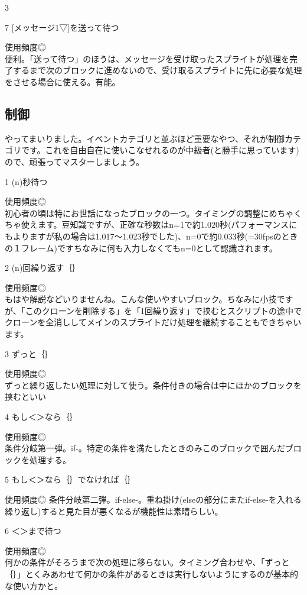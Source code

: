 \documentclass[b5paper,10pt]{jsarticle}
\begin{document}
\begin{multicols*}{3}
\begin{itembox}{7}
[メッセージ1▽]を送って待つ
\end{itembox}
使用頻度◎\\
便利。「送って待つ」のほうは、メッセージを受け取ったスプライトが処理を完了するまで次のブロックに進めないので、受け取るスプライトに先に必要な処理をさせる場合に使える。有能。

\subsection{制御}
やってまいりました。イベントカテゴリと並ぶほど重要なやつ、それが制御カテゴリです。これを自由自在に使いこなせれるのが中級者(と勝手に思っています)ので、頑張ってマスターしましょう。

\begin{itembox}{1}
(n)秒待つ
\end{itembox}
使用頻度◎\\
初心者の頃は特にお世話になったブロックの一つ。タイミングの調整にめちゃくちゃ使えます。豆知識ですが、正確な秒数はn=1で約1.020秒(パフォーマンスにもよりますが私の場合は1.017～1.023秒でした)、n=0で約0.033秒(=30fpsのときの１フレーム)ですちなみに何も入力しなくてもn=0として認識されます。
\begin{itembox}{2}
(n)回繰り返す｛｝
\end{itembox}
使用頻度◎\\
もはや解説などいりませんね。こんな使いやすいブロック。ちなみに小技ですが、「このクローンを削除する」を「1回繰り返す」で挟むとスクリプトの途中でクローンを全消ししてメインのスプライトだけ処理を継続することもできちゃいます。
\begin{itembox}{3}
ずっと｛｝
\end{itembox}
使用頻度◎\\
ずっと繰り返したい処理に対して使う。条件付きの場合は中にほかのブロックを挟むといい
\begin{itembox}{4}
もし＜＞なら｛｝
\end{itembox}
使用頻度◎\\
条件分岐第一弾。if-。特定の条件を満たしたときのみこのブロックで囲んだブロックを処理する。
\begin{itembox}{5}
もし＜＞なら｛｝でなければ｛｝
\end{itembox}
使用頻度◎
条件分岐第二弾。if-else-。重ね掛け(elseの部分にまたif-else-を入れる繰り返し)すると見た目が悪くなるが機能性は素晴らしい。
\begin{itembox}{6}
＜＞まで待つ
\end{itembox}
使用頻度◎\\
何かの条件がそろうまで次の処理に移らない。タイミング合わせや、「ずっと｛｝」とくみあわせて何かの条件があるときは実行しないようにするのが基本的な使い方かと。

\end{multicols*}
\end{document}
